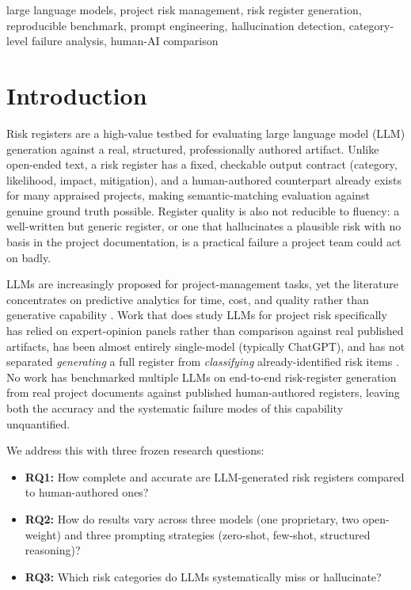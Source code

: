 \documentclass[10pt, conference, letterpaper]{IEEEtran}
\begin{document}
\begin{IEEEkeywords}
large language models, project risk management, risk register generation,
reproducible benchmark, prompt engineering, hallucination detection,
category-level failure analysis, human-AI comparison
\end{IEEEkeywords}

\section{Introduction}

Risk registers are a high-value testbed for evaluating large language model
(LLM) generation against a real, structured, professionally authored
artifact. Unlike open-ended text, a risk register has a fixed, checkable
output contract (category, likelihood, impact, mitigation), and a
human-authored counterpart already exists for many appraised projects,
making semantic-matching evaluation against genuine ground truth possible.
Register quality is also not reducible to fluency: a well-written but
generic register, or one that hallucinates a plausible risk with no basis
in the project documentation, is a practical failure a project team could
act on badly.

LLMs are increasingly proposed for project-management tasks, yet the
literature concentrates on predictive analytics for time, cost, and quality
rather than generative capability \cite{aidriven2026usecases}. Work that
does study LLMs for project risk specifically has relied on expert-opinion
panels rather than comparison against real published artifacts, has been
almost entirely single-model (typically ChatGPT), and has not separated
\emph{generating} a full register from \emph{classifying} already-identified
risk items
\cite{asce2025exploring_chatgpt_risk,buildings2025risk_classification}. No
work has benchmarked multiple LLMs on end-to-end risk-register generation
from real project documents against published human-authored registers,
leaving both the accuracy and the systematic failure modes of this
capability unquantified.

We address this with three frozen research questions:
\begin{itemize}
\item \textbf{RQ1:} How complete and accurate are LLM-generated risk
  registers compared to human-authored ones?
\item \textbf{RQ2:} How do results vary across three models (one
  proprietary, two open-weight) and three prompting strategies (zero-shot,
  few-shot, structured reasoning)?
\item \textbf{RQ3:} Which risk categories do LLMs systematically miss or
  hallucinate?
\end{itemize}
\end{document}
